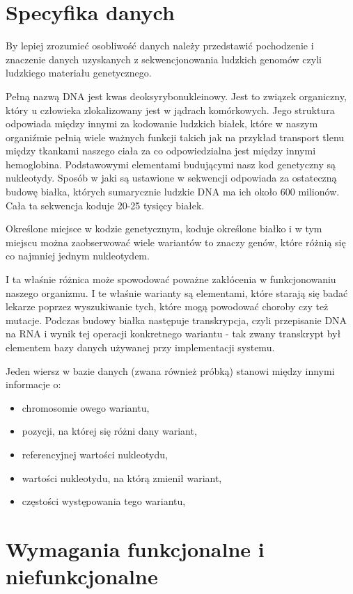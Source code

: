 \documentclass[a4paper,12pt,twoside]{article}
\begin{document}
\newpage
\section{Specyfika danych}  
By lepiej zrozumieć osobliwość danych należy przedstawić pochodzenie i znaczenie danych uzyskanych z sekwencjonowania ludzkich genomów czyli ludzkiego materiału genetycznego.

Pełną nazwą DNA jest kwas deoksyrybonukleinowy. Jest to związek organiczny,
który u człowieka zlokalizowany jest w jądrach komórkowych.
Jego struktura odpowiada między innymi za kodowanie ludzkich białek,
które w naszym organiźmie pełnią wiele ważnych funkcji takich jak
na przykład transport tlenu między tkankami naszego ciała za co 
odpowiedzialna jest między innymi hemoglobina.
Podstawowymi elementami budującymi nasz kod genetyczny są
nukleotydy. Sposób w jaki są ustawione w sekwencji odpowiada
za ostateczną budowę białka, których sumarycznie ludzkie DNA ma ich około 
600 milionów. Cała ta sekwencja koduje 20-25 tysięcy białek.

Określone miejsce w kodzie genetycznym, koduje określone białko
i w tym miejscu można zaobserwować wiele wariantów to znaczy 
genów, które różnią się co najmniej jednym nukleotydem.

I ta właśnie różnica może spowodować poważne 
zakłócenia w funkcjonowaniu naszego organizmu.
I te właśnie warianty są elementami, które starają się badać
lekarze poprzez wyszukiwanie tych, które mogą powodować choroby
czy też mutacje.
Podczas budowy białka następuje transkrypcja, czyli przepisanie DNA na RNA
i wynik tej operacji konkretnego wariantu - tak zwany transkrypt był elementem bazy danych używanej przy implementacji systemu.
 
Jeden wiersz w bazie danych (zwana również próbką) stanowi między innymi informacje o:
\begin{itemize}
\item chromosomie owego wariantu,
\item pozycji, na której się różni dany wariant,
\item referencyjnej wartości nukleotydu,
\item wartości nukleotydu, na którą zmienił wariant,
\item częstości występowania tego wariantu,
\end{itemize}



\newpage
\section{Wymagania funkcjonalne i niefunkcjonalne}  
\end{document}
